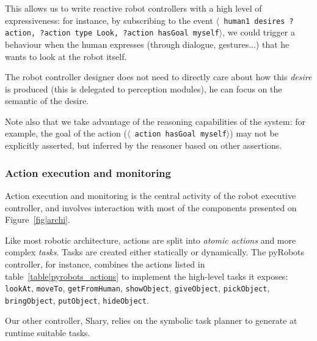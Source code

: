 \documentclass[preprint,5p]{elsarticle}
\newcommand{\stmt}[1]{{\footnotesize \tt $\langle$ #1\relax$\rangle$}}
\begin{document}
This allows us to write reactive robot controllers with a high level of
expressiveness: for instance, by subscribing to the event \stmt{human1 desires
?action, ?action type Look, ?action hasGoal myself}, we could trigger a
behaviour when the human expresses (through dialogue, gestures...) that he
wants to look at the robot itself.

The robot controller designer does not need to directly care about how this
\emph{desire} is produced (this is delegated to perception modules), he can
focus on the semantic of the desire.

Note also that we take advantage of the reasoning capabilities of the system:
for example, the goal of the action (\stmt{action hasGoal myself}) may not be
explicitly asserted, but inferred by the reasoner based on other assertions.

\subsubsection{Action execution and monitoring}\label{sec:action}

Action execution and monitoring is the central activity of the robot executive
controller, and involves interaction with most of the components presented on
Figure~\ref{fig|archi}.

Like most robotic architecture, actions are split into \emph{atomic actions}
and more complex \emph{tasks}. Tasks are created either statically or dynamically.
The {\sc pyRobots} controller, for instance, combines the actions listed in
table~\ref{table|pyrobots_actions} to implement the high-level tasks it exposes: {\tt
lookAt}, {\tt moveTo}, {\tt getFromHuman}, {\tt showObject}, {\tt giveObject},
{\tt pickObject}, {\tt bringObject}, {\tt putObject}, {\tt hideObject}.

Our other controller, {\sc Shary}, relies on the symbolic task planner to
generate at runtime suitable tasks.
\end{document}
